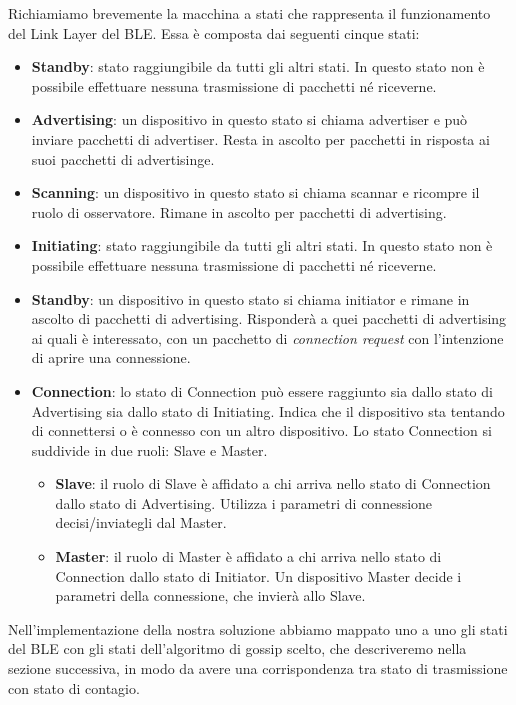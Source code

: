 Richiamiamo brevemente la macchina a stati che rappresenta il funzionamento del Link Layer del \acs{BLE}. Essa è composta dai seguenti cinque stati:
\begin{itemize}
	\item \textbf{Standby}: stato raggiungibile da tutti gli altri stati. In questo stato non è possibile effettuare nessuna trasmissione di pacchetti né riceverne.
	\item \textbf{Advertising}: un dispositivo in questo stato si chiama advertiser e può inviare pacchetti di advertiser. Resta in ascolto per pacchetti in risposta ai suoi pacchetti di advertisinge.
	\item \textbf{Scanning}: un dispositivo in questo stato si chiama scannar e ricompre il ruolo di osservatore. Rimane in ascolto per pacchetti di advertising.
	\item \textbf{Initiating}: stato raggiungibile da tutti gli altri stati. In questo stato non è possibile effettuare nessuna trasmissione di pacchetti né riceverne.
	\item \textbf{Standby}: un dispositivo in questo stato si chiama initiator e rimane in ascolto di pacchetti di advertising. Risponderà a quei pacchetti di advertising ai quali è interessato, con un pacchetto di \textit{connection request} con l'intenzione di aprire una connessione.
	\item \textbf{Connection}: lo stato di Connection può essere raggiunto sia dallo stato di Advertising sia dallo stato di Initiating. Indica che il dispositivo sta tentando di connettersi o è connesso con un altro dispositivo. Lo stato Connection si suddivide in due ruoli: Slave e Master.
	\begin{itemize}
		\item \textbf{Slave}: il ruolo di Slave è affidato a chi arriva nello stato di Connection dallo stato di Advertising. Utilizza i parametri di connessione decisi/inviategli dal Master.
		\item \textbf{Master}: il ruolo di Master è affidato a chi arriva nello stato di Connection dallo stato di Initiator. Un dispositivo Master decide i parametri della connessione, che invierà allo Slave.
	\end{itemize}
\end{itemize}
Nell'implementazione della nostra soluzione abbiamo mappato uno a uno gli stati del BLE con gli stati dell'algoritmo di gossip scelto, che descriveremo nella sezione successiva, in modo da avere una corrispondenza tra stato di trasmissione con stato di contagio.
